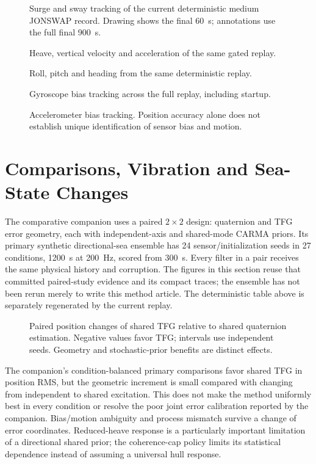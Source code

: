 \documentclass[conference]{IEEEtran}
\newcommand{\IncludePGF}[1]{\resizebox{\linewidth}{!}{}}
\begin{document}
\begin{figure}[!t]\centering
\IncludePGF{w3d_tfg_csm_method_jonswap_medium_xykin.pgf}
\caption{Surge and sway tracking of the current deterministic medium JONSWAP
record. Drawing shows the final 60~s; annotations use the full final 900~s.}
\end{figure}
\begin{figure}[!t]\centering
\IncludePGF{w3d_tfg_csm_method_jonswap_medium_zkin.pgf}
\caption{Heave, vertical velocity and acceleration of the same gated replay.}
\end{figure}
\begin{figure}[!t]\centering
\IncludePGF{w3d_tfg_csm_method_jonswap_medium_att.pgf}
\caption{Roll, pitch and heading from the same deterministic replay.}
\end{figure}
\begin{figure}[!t]\centering
\IncludePGF{w3d_tfg_csm_method_jonswap_medium_gyro_bias.pgf}
\caption{Gyroscope bias tracking across the full replay, including startup.}
\end{figure}
\begin{figure}[!t]\centering
\IncludePGF{w3d_tfg_csm_method_jonswap_medium_acc_bias.pgf}
\caption{Accelerometer bias tracking. Position accuracy alone does not establish
unique identification of sensor bias and motion.}
\end{figure}

\section{Comparisons, Vibration and Sea-State Changes}
\label{sec:scope}
The comparative companion uses a paired $2\times2$ design: quaternion and
TFG error geometry, each with independent-axis and shared-mode CARMA priors.
Its primary synthetic directional-sea ensemble has 24 sensor/initialization
seeds in 27 conditions, 1200~s at 200~Hz, scored from 300~s. Every filter in
a pair receives the same physical history and corruption. The figures in
this section reuse that committed paired-study evidence and its compact
traces; the ensemble has not been rerun merely to write this method article.
The deterministic table above is separately regenerated by the current replay.

\begin{figure}[!t]\centering
\IncludePGF{../../reports/results/tfg_shared_modes/figures/paired_position.pgf}
\caption{Paired position changes of shared TFG relative to shared quaternion
estimation. Negative values favor TFG; intervals use independent seeds.
Geometry and stochastic-prior benefits are distinct effects.}
\end{figure}
The companion's condition-balanced primary comparisons favor shared TFG in
position RMS, but the geometric increment is small compared with changing
from independent to shared excitation. This does not make the method uniformly
best in every condition or resolve the poor joint error calibration reported
by the companion. Bias/motion ambiguity and process mismatch survive a change
of error coordinates. Reduced-heave response is a particularly important
limitation of a directional shared prior; the coherence-cap policy limits its
statistical dependence instead of assuming a universal hull response.
\end{document}
